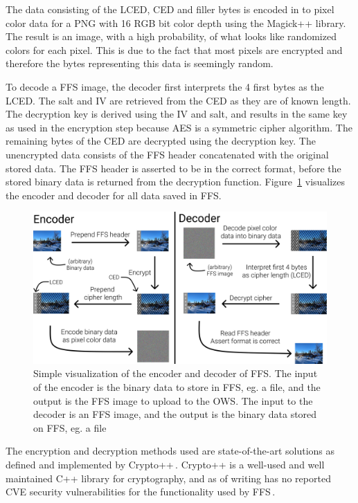 The data consisting of the LCED, CED and filler bytes is encoded in to pixel color data for a PNG with 16 RGB bit color depth using the Magick++ library. The result is an image, with a high probability, of what looks like randomized colors for each pixel. This is due to the fact that most pixels are encrypted and therefore the bytes representing this data is seemingly random.

To decode a FFS image, the decoder first interprets the 4 first bytes as the LCED. The salt and IV are retrieved from the CED as they are of known length. The decryption key is derived using the IV and salt, and results in the same key as used in the encryption step because AES is a symmetric cipher algorithm. The remaining bytes of the CED are decrypted using the decryption key. The unencrypted data consists of the FFS header concatenated with the original stored data. The FFS header is asserted to be in the correct format, before the stored binary data is returned from the decryption function. Figure~\ref{fig:file_enc_dec} visualizes the encoder and decoder for all data saved in FFS.

\begin{figure}[!ht]
	\begin{center}
	  \includegraphics[width=1.0\textwidth]{figures/encoder_decoder.png}
	\end{center}
	\caption[Simple visualization of the encoder and decoder of FFS]{Simple visualization of the encoder and decoder of FFS. The input of the encoder is the binary data to store in FFS, eg. a file, and the output is the FFS image to upload to the OWS. The input to the decoder is an FFS image, and the output is the binary data stored on FFS, eg. a file}
	\label{fig:file_enc_dec}
\end{figure}

The encryption and decryption methods used are state-of-the-art solutions as defined and implemented by Crypto++\,\cite{CryptoLibraryFree}. Crypto++ is a well-used and well maintained C++ library for cryptography, and as of writing has no reported CVE security vulnerabilities for the functionality used by FFS\,\cite{CryptoppSecurityVulnerabilities}.

